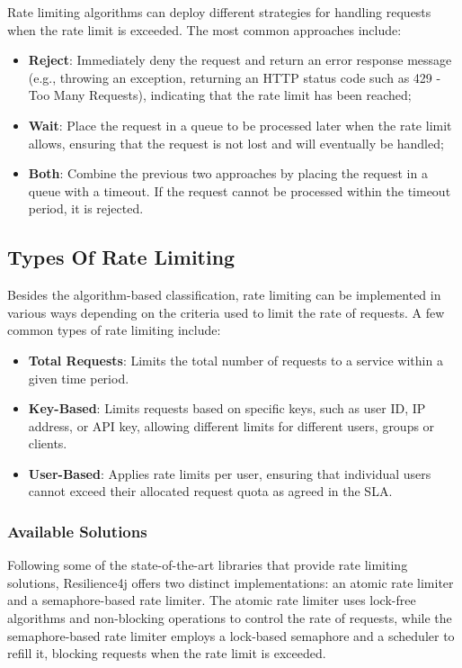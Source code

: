 Rate limiting algorithms can deploy different strategies for handling requests when the rate limit is exceeded.
The most common approaches include:

\begin{itemize}
    \item \textbf{Reject}: Immediately deny the request and return an error response message (e.g., throwing an exception,
    returning an HTTP status code such as 429 - Too Many Requests), indicating that the rate limit has been reached;
    \item \textbf{Wait}: Place the request in a queue to be processed later when the rate limit allows, ensuring that the request is not lost and will eventually be handled;
    \item \textbf{Both}: Combine the previous two approaches by placing the request in a queue with a timeout.
    If the request cannot be processed within the timeout period, it is rejected.
\end{itemize}

\subsection{Types Of Rate Limiting}\label{subsec:rate-limiter-types}

Besides the algorithm-based classification, rate limiting can be implemented in various ways depending on the criteria used to limit the rate of requests.
A few common types of rate limiting include:
\begin{itemize}
    \item \textbf{Total Requests}: Limits the total number of requests to a service within a given time period.
    \item \textbf{Key-Based}: Limits requests based on specific keys, such as user ID, IP address, or API key,
    allowing different limits for different users, groups or clients.
    \item \textbf{User-Based}: Applies rate limits per user,
    ensuring that individual users cannot exceed their allocated request quota as agreed in the SLA.
\end{itemize}

\subsubsection{Available Solutions}\label{subsubsec:rate-limiter-solutions}

Following some of the state-of-the-art libraries that provide rate limiting solutions,
Resilience4j offers two distinct implementations: an atomic rate limiter and a semaphore-based rate limiter.
The atomic rate limiter uses lock-free algorithms and non-blocking operations to control the rate of requests,
while the semaphore-based rate limiter employs a lock-based semaphore and a scheduler to refill it,
blocking requests when the rate limit is exceeded.

